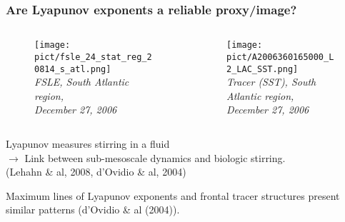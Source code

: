 \documentclass[compress,slidescentered,notes=show]{beamer}
\newcommand{\legende}[1]{\textit{\footnotesize #1}}
\begin{document}
\begin{frame}
  \frametitle{Are Lyapunov exponents a reliable proxy/image?}
  \begin{columns}
    \begin{column}{0.5\textwidth}
      \begin{figure}%
        \texttt{[image: pict/fsle\_24\_stat\_reg\_20814\_s\_atl.png]}\\
        \legende{FSLE, South Atlantic region, \\December 27, 2006}
      \end{figure}
    \end{column}
    \begin{column}{0.5\textwidth}
      \begin{figure}
        \texttt{[image: pict/A2006360165000\_L2\_LAC\_SST.png]}\\
        \legende{Tracer (SST), South Atlantic region, \\December 27, 2006}
      \end{figure}
    \end{column}
  \end{columns}
  \vspace{0.5cm}
  \begin{block}{}
  Lyapunov measures stirring in a fluid \\
  $\rightarrow$ Link between sub-mesoscale dynamics and biologic stirring. \\
  (Lehahn \& al, 2008, d'Ovidio \& al, 2004)
  \end{block}
  Maximum lines of Lyapunov exponents and frontal tracer structures present similar patterns (d'Ovidio \& al (2004)).
\end{frame}
\end{document}
